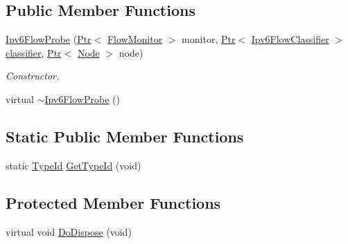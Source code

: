 \subsection*{Public Member Functions}
\begin{DoxyCompactItemize}
\item 
\hyperlink{classns3_1_1Ipv6FlowProbe_aa276e5ac5c1a0162bd987f235a8164a5}{Ipv6\+Flow\+Probe} (\hyperlink{classns3_1_1Ptr}{Ptr}$<$ \hyperlink{classns3_1_1FlowMonitor}{Flow\+Monitor} $>$ monitor, \hyperlink{classns3_1_1Ptr}{Ptr}$<$ \hyperlink{classns3_1_1Ipv6FlowClassifier}{Ipv6\+Flow\+Classifier} $>$ \hyperlink{design_8txt_af9e6b398b148789960232a87c72a107e}{classifier}, \hyperlink{classns3_1_1Ptr}{Ptr}$<$ \hyperlink{classns3_1_1Node}{Node} $>$ node)
\begin{DoxyCompactList}\small\item\em Constructor. \end{DoxyCompactList}\item 
virtual \hyperlink{classns3_1_1Ipv6FlowProbe_a389c26cd04f7c9a0c59f326f3a45504d}{$\sim$\+Ipv6\+Flow\+Probe} ()
\end{DoxyCompactItemize}
\subsection*{Static Public Member Functions}
\begin{DoxyCompactItemize}
\item 
static \hyperlink{classns3_1_1TypeId}{Type\+Id} \hyperlink{classns3_1_1Ipv6FlowProbe_a119f565f075c927bfe2fc5d7c1dba9b4}{Get\+Type\+Id} (void)
\end{DoxyCompactItemize}
\subsection*{Protected Member Functions}
\begin{DoxyCompactItemize}
\item 
virtual void \hyperlink{classns3_1_1Ipv6FlowProbe_a69e78afe62dbb9eb3755650e462f65fe}{Do\+Dispose} (void)
\end{DoxyCompactItemize}
